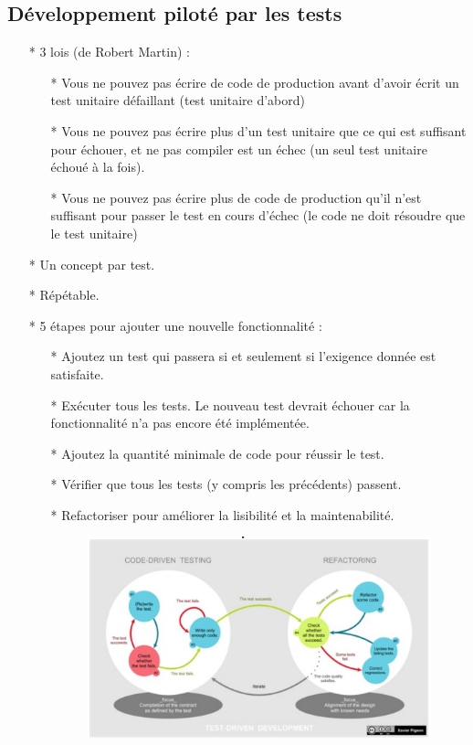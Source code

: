 \documentclass[12pt]{article}
\begin{document}
\subsection{Développement piloté par les tests}
\begin{itemize}
	\item[* ] 3 lois (de Robert Martin) :
	\begin{itemize}
		\item[* ] Vous ne pouvez pas écrire de code de production avant d'avoir écrit un test unitaire défaillant (test unitaire
		d'abord)
		\item[* ] Vous ne pouvez pas écrire plus d'un test unitaire que ce qui est suffisant pour échouer, et ne pas compiler est un échec (un seul test unitaire échoué à la fois).
		\item[* ] Vous ne pouvez pas écrire plus de code de production qu'il n'est suffisant pour passer le test en cours d'échec (le code ne doit résoudre que le test unitaire)
	\end{itemize}
\item[* ] Un concept par test.
\item[* ] Répétable.
\item[* ] 5 étapes pour ajouter une nouvelle fonctionnalité :\\
\begin{itemize}
	\item[* ] Ajoutez un test qui passera si et seulement si l'exigence donnée est satisfaite.
	\item[* ] Exécuter tous les tests. Le nouveau test devrait échouer car la fonctionnalité n'a pas encore été implémentée.
	\item[* ] Ajoutez la quantité minimale de code pour réussir le test.
	\item[* ] Vérifier que tous les tests (y compris les précédents) passent.
	\item[* ] Refactoriser pour améliorer la lisibilité et la maintenabilité.
		\begin{figure}[!hbtp]
		\centering
		\includegraphics[scale=0.75]{Capture1.PNG}
	\end{figure}
\end{itemize}
\end{itemize}
\end{document}

